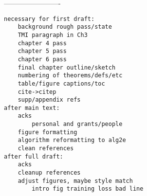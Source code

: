 -------------------------

\begin{verbatim}
necessary for first draft:
	background rough pass/state
	TMI paragraph in Ch3
	chapter 4 pass
	chapter 5 pass
	chapter 6 pass
	final chapter outline/sketch
    numbering of theorems/defs/etc
	table/figure captions/toc
	cite->citep
	supp/appendix refs
after main text:
    acks
    	personal and grants/people
    figure formatting
    algorithm reformatting to alg2e
    clean references
after full draft:
	acks
	cleanup references
	adjust figures, maybe style match
		intro fig training loss bad line
\end{verbatim}

